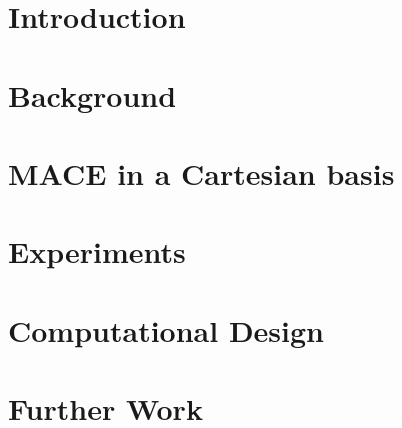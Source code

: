 \documentclass[11pt,a4paper]{article}
\begin{document}
\newpage
\tableofcontents
\newpage





\section{Introduction}



\section{Background}





\section{MACE in a Cartesian basis}



\section{Experiments}





\section{Computational Design}



\section{Further Work}


\end{document}
